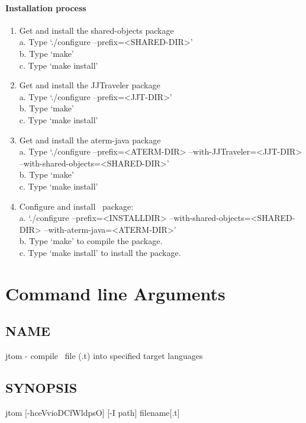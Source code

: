 \paragraph{Installation process}
\begin{enumerate}
\item Get and install the shared-objects package
\\ a. Type `./configure --prefix=<SHARED-DIR>'
\\ b. Type `make'
\\ c. Type `make install'
\item Get and install the JJTraveler package
\\ a. Type `./configure --prefix=<JJT-DIR>'
\\ b. Type `make'
\\ c. Type `make install'
\item Get and install the aterm-java package
\\ a. Type `./configure --prefix=<ATERM-DIR>
--with-JJTraveler=<JJT-DIR> --with-shared-objects=<SHARED-DIR>' 
\\ b. Type `make'
\\ c. Type `make install'
\item Configure and install \TOM\ package:
\\ a. `./configure --prefix=<INSTALLDIR>
--with-shared-objects=<SHARED-DIR> --with-aterm-java=<ATERM-DIR>'
\\ b. Type `make' to compile the package.
\\ c. Type `make install' to install the package.
\end{enumerate}


\section{Command line Arguments}
\subsection{NAME}
     jtom - compile \TOM\ file (.t) into specified target languages

\subsection{SYNOPSIS}
     jtom [-hceVvioDCfWldpsO] [-I path] filename[.t]

